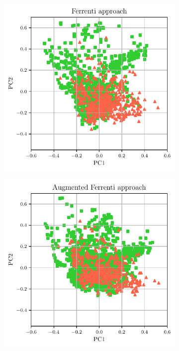 \documentclass[superscriptaddress,unsortedaddress,
 amsmath,amssymb,
 aps,
]{revtex4-2}
\begin{document}
\begin{figure}%
    \centering
    \begin{subfigure}{0.3\textwidth}
        \centering
        \includegraphics[width=1\textwidth]{figures/pca-2d-plots/01-ferrenti-approach-v3.pdf}
    \end{subfigure}%
    \begin{subfigure}{0.3\textwidth}
        \centering
        \includegraphics[width=1\textwidth]{figures/pca-2d-plots/02-augmented-ferrenti-approach-v2.pdf}

\end{subfigure}
\end{figure}
\end{document}
